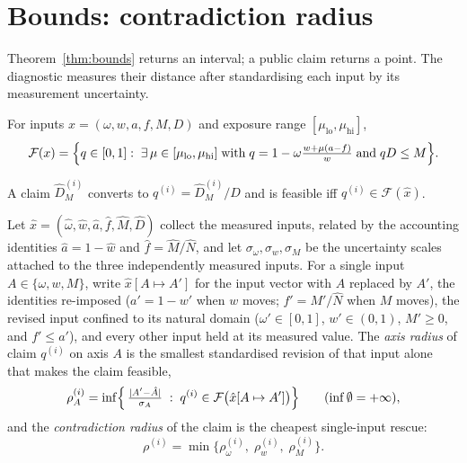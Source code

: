 \section{Bounds: contradiction radius}\label{sec:contradiction}

Theorem~\ref{thm:bounds} returns an interval; a public claim returns a point. The diagnostic measures their distance after standardising each input by its measurement uncertainty.

\begin{definition}\label{def:feasible}
For inputs $x=(\omega,w,a,f,M,D)$ and exposure range $[\mu_{\mathrm{lo}},\mu_{\mathrm{hi}}]$,
\begin{equation}\label{eq:feasible}
\mathcal F(x)=
\Bigl\{q\in[0,1]:\;
\exists\,\mu\in[\mu_{\mathrm{lo}},\mu_{\mathrm{hi}}]\;\text{with}\;
q=1-\omega\tfrac{w+\mu(a-f)}{w}
\;\text{and}\; qD\le M\Bigr\}.
\end{equation}
\end{definition}

A claim $\hat D_M^{(i)}$ converts to $q^{(i)}=\hat D_M^{(i)}/\hat D$ and is feasible iff $q^{(i)}\in\mathcal F(\hat x)$.

\begin{definition}\label{def:radius}
Let $\hat x=(\hat\omega,\hat w,\hat a,\hat f,\hat M,\hat D)$ collect the measured inputs, related by the accounting identities $\hat a=1-\hat w$ and $\hat f=\hat M/\hat N$, and let $\sigma_\omega,\sigma_w,\sigma_M$ be the uncertainty scales attached to the three independently measured inputs. For a single input $A\in\{\omega,w,M\}$, write $\hat x[A\mapsto A']$ for the input vector with $A$ replaced by $A'$, the identities re-imposed ($a'=1-w'$ when $w$ moves; $f'=M'/\hat N$ when $M$ moves), the revised input confined to its natural domain ($\omega'\in[0,1]$, $w'\in(0,1)$, $M'\ge 0$, and $f'\le a'$), and every other input held at its measured value. The \emph{axis radius} of claim $q^{(i)}$ on axis $A$ is the smallest standardised revision of that input alone that makes the claim feasible,
\begin{equation*}
\rho_A^{(i)}
=\inf\Bigl\{\,\tfrac{|A'-\hat A|}{\sigma_A}
\;:\;q^{(i)}\in \mathcal F\bigl(\hat x[A\mapsto A']\bigr)\Bigr\}
\qquad(\inf\emptyset=+\infty),
\end{equation*}
and the \emph{contradiction radius} of the claim is the cheapest single-input rescue:
\begin{equation}\label{eq:rho}
\rho^{(i)}=\min\bigl\{\rho_\omega^{(i)},\;\rho_w^{(i)},\;\rho_M^{(i)}\bigr\}.
\end{equation}
\end{definition}

